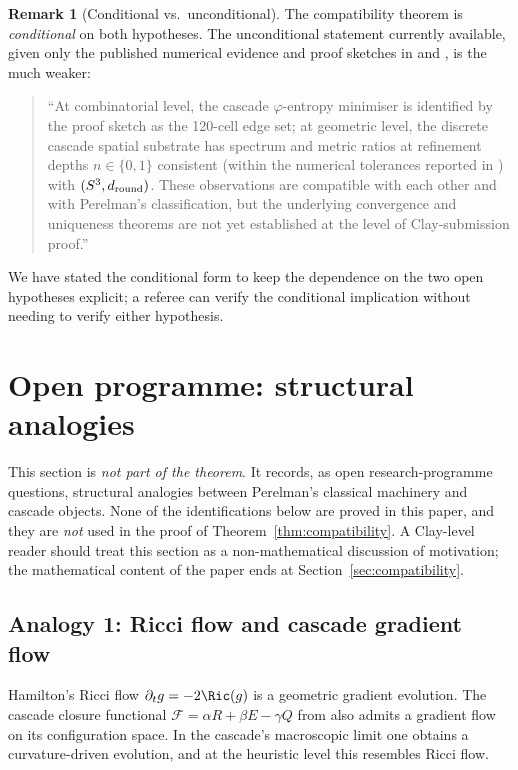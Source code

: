\documentclass[11pt, a4paper]{amsart}
\theoremstyle{definition}
\newtheorem{remark}[theorem]{Remark}
\begin{document}
\begin{remark}[Conditional vs.\ unconditional]
The compatibility theorem is \emph{conditional} on both
hypotheses. The unconditional statement currently available, given
only the published numerical evidence and proof sketches in
\cite[\S C2.bis]{CascadeGR} and \cite[\S P5]{CascadePregeometry},
is the much weaker:
\begin{quote}
``At combinatorial level, the cascade $\varphi$-entropy minimiser
is identified by the proof sketch \cite[\S P5.2]{CascadePregeometry}
as the 120-cell edge set; at geometric level, the discrete cascade
spatial substrate has spectrum and metric ratios at refinement
depths $n \in \{0,1\}$ consistent (within the numerical tolerances
reported in \cite[\S C2.bis.4]{CascadeGR}) with $(S^{3},
d_{\rm round})$. These observations are compatible with each other
and with Perelman's classification, but the underlying convergence
and uniqueness theorems are not yet established at the level of
Clay-submission proof.''
\end{quote}
We have stated the conditional form to keep the dependence on the
two open hypotheses explicit; a referee can verify the conditional
implication without needing to verify either hypothesis.
\end{remark}

\section{Open programme: structural analogies}
\label{sec:programme}

This section is \emph{not part of the theorem}. It records, as
open research-programme questions, structural analogies between
Perelman's classical machinery and cascade objects. None of the
identifications below are proved in this paper, and they are
\emph{not} used in the proof of Theorem~\ref{thm:compatibility}.
A Clay-level reader should treat this section as a non-mathematical
discussion of motivation; the mathematical content of the paper
ends at Section~\ref{sec:compatibility}.

\subsection{Analogy 1: Ricci flow and cascade gradient flow}

Hamilton's Ricci flow $\partial_{t} g = -2\Ric(g)$ is a geometric
gradient evolution. The cascade closure functional
$\mathcal{F} = \alpha R + \beta E - \gamma Q$ from
\cite[F2]{CascadeFoundations} also admits a gradient flow on its
configuration space. In the cascade's macroscopic limit one
obtains a curvature-driven evolution, and at the heuristic level
this resembles Ricci flow.
\end{document}
